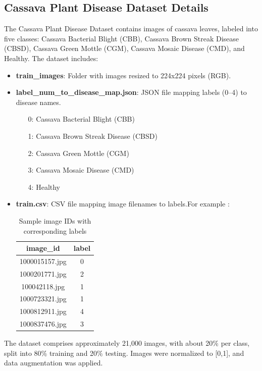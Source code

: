 \documentclass[a4paper,12pt]{article}
\begin{document}
\subsection*{Cassava Plant Disease Dataset Details}
The Cassava Plant Disease Dataset contains images of cassava leaves, labeled into five classes: Cassava Bacterial Blight (CBB), Cassava Brown Streak Disease (CBSD), Cassava Green Mottle (CGM), Cassava Mosaic Disease (CMD), and Healthy. The dataset includes:
\begin{itemize}
    \item \textbf{train\_images}: Folder with images resized to 224x224 pixels (RGB).
    \item \textbf{label\_num\_to\_disease\_map.json}: JSON file mapping labels (0–4) to disease names.
    \begin{itemize}
    \item[0:] Cassava Bacterial Blight (CBB)
    \item[1:] Cassava Brown Streak Disease (CBSD)
    \item[2:] Cassava Green Mottle (CGM)
    \item[3:] Cassava Mosaic Disease (CMD)
    \item[4:] Healthy
\end{itemize}

    \item \textbf{train.csv}: CSV file mapping image filenames to labels.For example : 
    \begin{table}[h!]
\centering
\renewcommand{\arraystretch}{1.5}
\setlength{\tabcolsep}{44pt}

\begin{tabular}{|c|c|}
\hline
\textbf{image\_id} & \textbf{label} \\ \hline
1000015157.jpg & 0 \\ \hline
1000201771.jpg & 2 \\ \hline
100042118.jpg  & 1 \\ \hline
1000723321.jpg & 1 \\ \hline
1000812911.jpg & 4 \\ \hline
1000837476.jpg & 3 \\ \hline
\end{tabular}
\caption{Sample image IDs with corresponding labels}
\label{tab:sample_labels}
\end{table}

\end{itemize}
The dataset comprises approximately 21,000 images, with about 20\% per class, split into 80\% training and 20\% testing. Images were normalized to [0,1], and data augmentation was applied.
\end{document}
